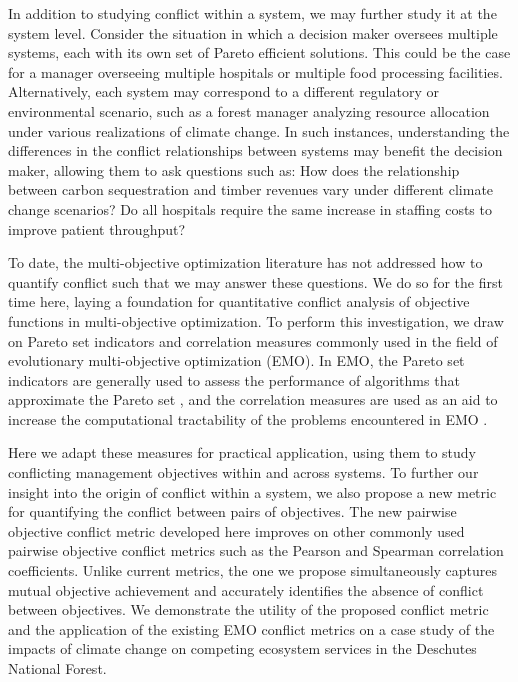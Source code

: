 In addition to studying conflict within a system, we may further study it at the system level. Consider the situation in which a decision maker oversees multiple systems, each with its own set of Pareto efficient solutions. This could be the case for a manager overseeing multiple hospitals or multiple food processing facilities. Alternatively, each system may correspond to a different regulatory or environmental scenario, such as a forest manager analyzing resource allocation under various realizations of climate change. In such instances, understanding the differences in the conflict relationships between systems may benefit the decision maker, allowing them to ask questions such as: How does the relationship between carbon sequestration and timber revenues vary under different climate change scenarios? Do all hospitals require the same increase in staffing costs to improve patient throughput?

To date, the multi-objective optimization literature has not addressed how to quantify conflict such that we may answer these questions. We do so for the first time here, laying a foundation for quantitative conflict analysis of objective functions in multi-objective optimization. To perform this investigation, we draw on Pareto set indicators and correlation measures commonly used in the field of evolutionary multi-objective optimization (EMO). In EMO, the Pareto set indicators are generally used to assess the performance of algorithms that approximate the Pareto set \cite{zitzler2003performance}, and the correlation measures are used as an aid to increase the computational tractability of the problems encountered in EMO \cite{brockhoff2006all}.

Here we adapt these measures for practical application, using them to study conflicting management objectives within and across systems. To further our insight into the origin of conflict within a system, we also propose a new metric for quantifying the conflict between pairs of objectives. The new pairwise objective conflict metric developed here improves on other commonly used pairwise objective conflict metrics such as the Pearson and Spearman correlation coefficients. Unlike current metrics, the one we propose simultaneously captures mutual objective achievement and accurately identifies the absence of conflict between objectives. We demonstrate the utility of the proposed conflict metric and the application of the existing EMO conflict metrics on a case study of the impacts of climate change on competing ecosystem services in the Deschutes National Forest.

